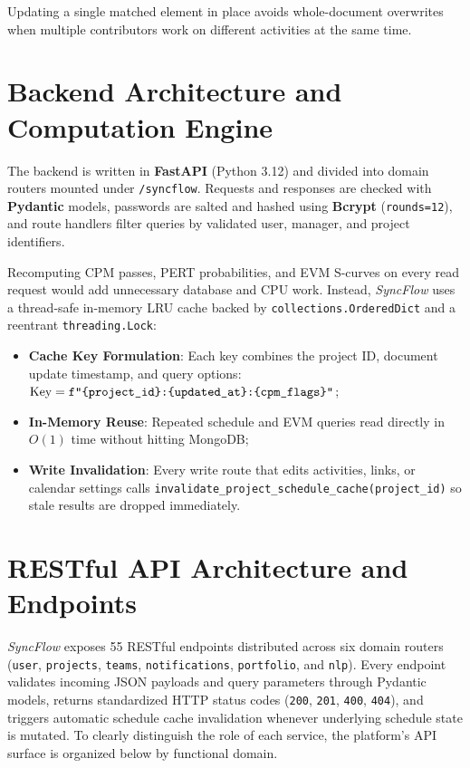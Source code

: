 Updating a single matched element in place avoids whole-document overwrites when multiple contributors work on different activities at the same time.

\vspace{6mm}

\section{Backend Architecture and Computation Engine}
The backend is written in \textbf{FastAPI} (Python 3.12) and divided into domain routers mounted under \texttt{/syncflow}. Requests and responses are checked with \textbf{Pydantic} models, passwords are salted and hashed using \textbf{Bcrypt} (\texttt{rounds=12}), and route handlers filter queries by validated user, manager, and project identifiers.

\vspace{4mm}

\noindent Recomputing CPM passes, PERT probabilities, and EVM S-curves on every read request would add unnecessary database and CPU work. Instead, \textit{SyncFlow} uses a thread-safe in-memory LRU cache backed by \texttt{collections.OrderedDict} and a reentrant \texttt{threading.Lock}:
\begin{itemize}[itemsep=0pt,topsep=1pt,parsep=0pt]
    \item \textbf{Cache Key Formulation}: Each key combines the project ID, document update timestamp, and query options: $\text{Key} = \texttt{f"\{project\_id\}:\allowbreak \{updated\_at\}:\allowbreak \{cpm\_flags\}"}$;
    \item \textbf{In-Memory Reuse}: Repeated schedule and EVM queries read directly in $O(1)$ time without hitting MongoDB;
    \item \textbf{Write Invalidation}: Every write route that edits activities, links, or calendar settings calls \texttt{invalidate\_\allowbreak project\_\allowbreak schedule\_\allowbreak cache(\allowbreak project\_id)} so stale results are dropped immediately.
\end{itemize}

\newpage

\section{RESTful API Architecture and Endpoints}
\textit{SyncFlow} exposes 55 RESTful endpoints distributed across six domain routers (\texttt{user}, \texttt{projects}, \texttt{teams}, \texttt{notifications}, \texttt{portfolio}, and \texttt{nlp}). Every endpoint validates incoming JSON payloads and query parameters through Pydantic models, returns standardized HTTP status codes (\texttt{200}, \texttt{201}, \texttt{400}, \texttt{404}), and triggers automatic schedule cache invalidation whenever underlying schedule state is mutated. To clearly distinguish the role of each service, the platform's API surface is organized below by functional domain.

